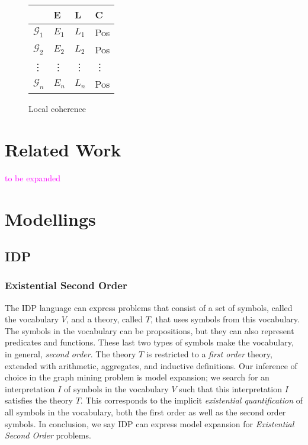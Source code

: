 \documentclass{article}
\theoremstyle{definition}
\newcommand{\graph}[1]{\ensuremath{\mathcal{#1}}}
\newcommand{\sergey}[1]{\textcolor{magenta}{\marginpar{\sc Sergey} #1}}
\begin{document}




\begin{figure}[h]
  \centering
  \begin{tabular}{l |l l l}
    & E & L      & C \\
    \hline
    $\graph{G}_{1}$  & $E_{1}$ & $L_{1}$ & Pos\\
    $\graph{G}_{2}$  & $E_{2}$ & $L_{2}$ & Pos\\
    \vdots & \vdots  & \vdots  & \vdots\\
    $\graph{G}_{n}$  & $E_{n}$ & $L_{n}$ & Pos\\
  \end{tabular}
  \caption{Local coherence\label{Fig:LocalCoherence}}
\end{figure}





\section{Related Work}
\sergey{to be expanded}
\section{Modellings}
\subsection{IDP}
\subsubsection{Existential Second Order}
The IDP language can express problems that consist of a set of symbols, called the vocabulary $V$, and a theory, called $T$, that uses symbols from this vocabulary.
The symbols in the vocabulary can be propositions, but they can also represent predicates and functions.
These last two types of symbols make the vocabulary, in general, \emph{second order}.
The theory $T$ is restricted to a \emph{first order} theory, extended with arithmetic, aggregates, and inductive definitions.
Our inference of choice in the graph mining problem is model expansion; we search for an interpretation $I$ of symbols in the vocabulary $V$ such that this interpretation $I$ satisfies the theory $T$.
This corresponds to the implicit \emph{existential quantification} of all symbols in the vocabulary, both the first order as well as the second order symbols.
In conclusion, we say IDP can express model expansion for \emph{Existential Second Order} problems. 
\end{document}
